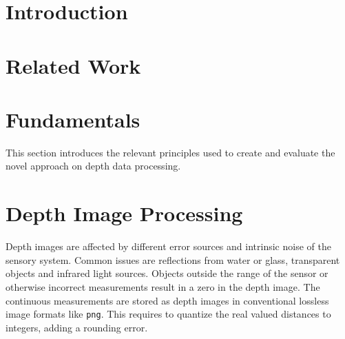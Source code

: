 \documentclass[numbers=noenddot,doktyp=marbeit,fontsize=12pt,sprache=english,hausschrift=true,draft=false]{TUBAFarbeiten}
\begin{document}
\maketitle
{}
\TUBAFErklaerungsseite%


\newpage

\newpage

\tableofcontents
\newpage



\newpage

\section{Introduction}\label{sec:introduction}

\newpage

\section{Related Work}\label{sec:related_work}

\newpage

\section{Fundamentals}\label{sec:fundamentals}

This section introduces the relevant principles used to create and evaluate the novel approach on depth data processing.






\newpage

\section{Depth Image Processing}\label{sec:image_processing}

Depth images are affected by different error sources and intrinsic noise of the sensory system.
Common issues are reflections from water or glass, transparent objects and infrared light sources.
Objects outside the range of the sensor or otherwise incorrect measurements result in a zero in the depth image.
The continuous measurements are stored as depth images in conventional lossless image formats like \texttt{png}.
This requires to quantize the real valued distances to integers, adding a rounding error.





\newpage
\end{document}

